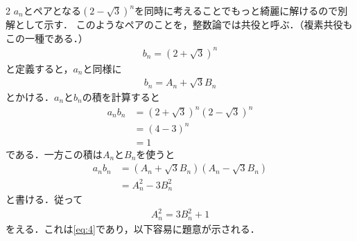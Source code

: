 \documentclass[../../main.tex]{subfiles}
\begin{document}
\begin{multicols}{2}
  $a_n$とペアとなる$(2-\sqrt{3})^n$を同時に考えることでもっと綺麗に解けるので別解として示す．
  このようなペアのことを，整数論では共役と呼ぶ．（複素共役もこの一種である．）
  \begin{align}
    b_n = (2+\sqrt{3})^n
  \end{align}
  と定義すると，$a_n$と同様に
  \begin{align}
    b_n = A_n + \sqrt{3} B_n
  \end{align}
  とかける．$a_n$と$b_n$の積を計算すると
  \begin{align}
    a_nb_n
    & = (2+\sqrt{3})^n(2-\sqrt{3})^n \\
    & = \left(4-3\right)^n           \\
    & = 1
  \end{align}
  である．一方この積は$A_n$と$B_n$を使うと
  \begin{align}
    a_nb_n
    & = (A_n+\sqrt{3}B_n)(A_n-\sqrt{3}B_n) \\
    & = A_n^2 -3B_n^2
  \end{align}
  と書ける．従って
  \begin{align}
    A_n^2 = 3B_n^2 +1
  \end{align}
  をえる．これは\cref{eq:4}であり，以下容易に題意が示される．

  \newpage
\end{multicols}
\end{document}
